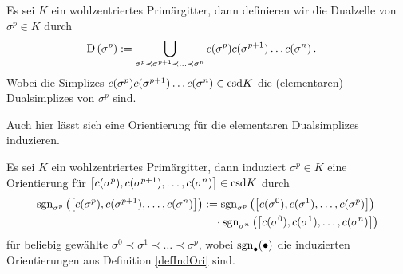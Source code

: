     \begin{definition}
      \label{defDualZelle}
      Es sei \( K \) ein wohlzentriertes Primärgitter, dann definieren wir die Dualzelle von \( \sigma^{p}\in K \) durch
      \begin{align}
        \text{D} \left( \sigma^{p} \right) &:= \bigcup_{\sigma^{p} \prec \sigma^{p+1} \prec \ldots \prec \sigma^{n}}
                                                    c(\sigma^{p}) c(\sigma^{p+1}) \ldots c(\sigma^{n}) \,\text{.}
      \end{align}
      Wobei die Simplizes \( c(\sigma^{p}) c(\sigma^{p+1}) \ldots c(\sigma^{n}) \in \text{csd} K \) die (elementaren) Dualsimplizes von \( \sigma^{p} \) sind.
    \end{definition}
    Auch hier lässt sich eine Orientierung für die elementaren Dualsimplizes induzieren.
    \begin{definition}
      \label{defIndOriElemDual}
      Es sei \( K \) ein wohlzentriertes Primärgitter, dann induziert \( \sigma^{p}\in K \) eine Orientierung für 
      \( \left[ c(\sigma^{p}), c(\sigma^{p+1}), \ldots, c(\sigma^{n}) \right] \in \text{csd} K \) durch
      \begin{align}
      \begin{aligned}
        \mathop{\mathrm{sgn}}\nolimits_{\sigma^{p}} \left( \left[ c(\sigma^{p}), c(\sigma^{p+1}), \ldots, c(\sigma^{n}) \right] \right)
          &:= \mathop{\mathrm{sgn}}\nolimits_{\sigma^{p}}\left( \left[ c(\sigma^{0}), c(\sigma^{1}), \ldots, c(\sigma^{p}) \right] \right)\\
          &\phantom{:=}\cdot \mathop{\mathrm{sgn}}\nolimits_{\sigma^{n}}\left( \left[ c(\sigma^{0}), c(\sigma^{1}), \ldots, c(\sigma^{n}) \right] \right)
      \end{aligned}
      \end{align}
      für beliebig gewählte \( \sigma^{0}\prec \sigma^{1} \prec \ldots \prec \sigma^{p} \), wobei \( \mathop{\mathrm{sgn}}\nolimits_{\bullet}(\bullet) \) die induzierten Orientierungen aus Definition \ref{defIndOri} sind.
    \end{definition}
